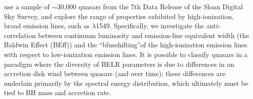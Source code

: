 \documentclass[a4paper,fleqn,usenatbib]{mnras}
\begin{document}
\citet{Richards2011} 
use a sample of $\sim$30,000 quasars from the 7th Data Release of the Sloan Digital Sky Survey, and explore the range of properties exhibited by high-ionization, broad emission lines, such as \civ $\lambda$1549. Specifically, we investigate the anti-correlation between continuum luminosity and emission-line equivalent width (the Baldwin Effect (BEff)) and the ``blueshifting''of the high-ionization emission lines with respect to low-ionization emission lines. 
It is possible to classify quasars in a paradigm where the diversity of BELR parameters is due to differences in an accretion disk wind between quasars (and over time); these differences are underlain primarily by the spectral energy distribution, which ultimately must be tied to BH mass and accretion rate.



\end{document}
